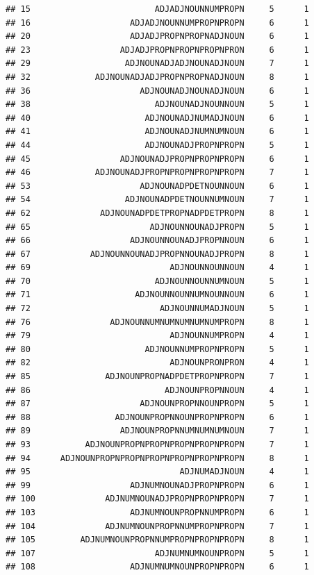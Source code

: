 \documentclass[]{article}
\begin{document}
\begin{verbatim}
## 15                         ADJADJNOUNNUMPROPN     5      1
## 16                    ADJADJNOUNNUMPROPNPROPN     6      1
## 20                    ADJADJPROPNPROPNADJNOUN     6      1
## 23                  ADJADJPROPNPROPNPROPNPRON     6      1
## 29                   ADJNOUNADJADJNOUNADJNOUN     7      1
## 32             ADJNOUNADJADJPROPNPROPNADJNOUN     8      1
## 36                      ADJNOUNADJNOUNADJNOUN     6      1
## 38                         ADJNOUNADJNOUNNOUN     5      1
## 40                       ADJNOUNADJNUMADJNOUN     6      1
## 41                       ADJNOUNADJNUMNUMNOUN     6      1
## 44                       ADJNOUNADJPROPNPROPN     5      1
## 45                  ADJNOUNADJPROPNPROPNPROPN     6      1
## 46             ADJNOUNADJPROPNPROPNPROPNPROPN     7      1
## 53                      ADJNOUNADPDETNOUNNOUN     6      1
## 54                   ADJNOUNADPDETNOUNNUMNOUN     7      1
## 62              ADJNOUNADPDETPROPNADPDETPROPN     8      1
## 65                        ADJNOUNNOUNADJPROPN     5      1
## 66                    ADJNOUNNOUNADJPROPNNOUN     6      1
## 67            ADJNOUNNOUNADJPROPNNOUNADJPROPN     8      1
## 69                            ADJNOUNNOUNNOUN     4      1
## 70                         ADJNOUNNOUNNUMNOUN     5      1
## 71                     ADJNOUNNOUNNUMNOUNNOUN     6      1
## 72                          ADJNOUNNUMADJNOUN     5      1
## 76                ADJNOUNNUMNUMNUMNUMNUMPROPN     8      1
## 79                            ADJNOUNNUMPROPN     4      1
## 80                       ADJNOUNNUMPROPNPROPN     5      1
## 82                            ADJNOUNPRONPRON     4      1
## 85               ADJNOUNPROPNADPDETPROPNPROPN     7      1
## 86                           ADJNOUNPROPNNOUN     4      1
## 87                      ADJNOUNPROPNNOUNPROPN     5      1
## 88                 ADJNOUNPROPNNOUNPROPNPROPN     6      1
## 89                  ADJNOUNPROPNNUMNUMNUMNOUN     7      1
## 93           ADJNOUNPROPNPROPNPROPNPROPNPROPN     7      1
## 94      ADJNOUNPROPNPROPNPROPNPROPNPROPNPROPN     8      1
## 95                              ADJNUMADJNOUN     4      1
## 99                    ADJNUMNOUNADJPROPNPROPN     6      1
## 100              ADJNUMNOUNADJPROPNPROPNPROPN     7      1
## 103                   ADJNUMNOUNPROPNNUMPROPN     6      1
## 104              ADJNUMNOUNPROPNNUMPROPNPROPN     7      1
## 105         ADJNUMNOUNPROPNNUMPROPNPROPNPROPN     8      1
## 107                        ADJNUMNUMNOUNPROPN     5      1
## 108                   ADJNUMNUMNOUNPROPNPROPN     6      1

\end{verbatim}
\end{document}
